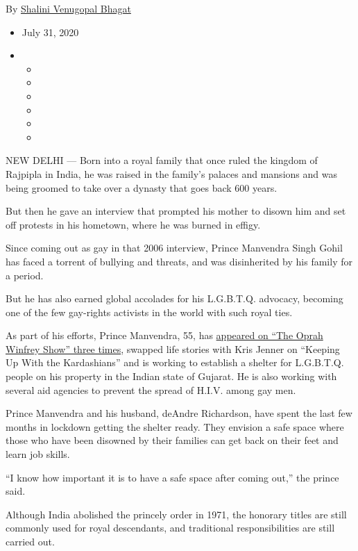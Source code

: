 By \href{https://www.nytimes.com/by/shalini-venugopal-bhagat}{Shalini
Venugopal Bhagat}

\begin{itemize}
\item
  July 31, 2020
\item
  \begin{itemize}
  \item
  \item
  \item
  \item
  \item
  \item
  \end{itemize}
\end{itemize}

NEW DELHI --- Born into a royal family that once ruled the kingdom of
Rajpipla in India, he was raised in the family's palaces and mansions
and was being groomed to take over a dynasty that goes back 600 years.

But then he gave an interview that prompted his mother to disown him and
set off protests in his hometown, where he was burned in effigy.

Since coming out as gay in that 2006 interview, Prince Manvendra Singh
Gohil has faced a torrent of bullying and threats, and was disinherited
by his family for a period.

But he has also earned global accolades for his L.G.B.T.Q. advocacy,
becoming one of the few gay-rights activists in the world with such
royal ties.

As part of his efforts, Prince Manvendra, 55, has
\href{https://www.youtube.com/watch?v=i6a39D0PtPM}{appeared on ``The
Oprah Winfrey Show'' three times}, swapped life stories with Kris Jenner
on ``Keeping Up With the Kardashians'' and is working to establish a
shelter for L.G.B.T.Q. people on his property in the Indian state of
Gujarat. He is also working with several aid agencies to prevent the
spread of H.I.V. among gay men.

Prince Manvendra and his husband, deAndre Richardson, have spent the
last few months in lockdown getting the shelter ready. They envision a
safe space where those who have been disowned by their families can get
back on their feet and learn job skills.

``I know how important it is to have a safe space after coming out,''
the prince said.

Although India abolished the princely order in 1971, the honorary titles
are still commonly used for royal descendants, and traditional
responsibilities are still carried out.

